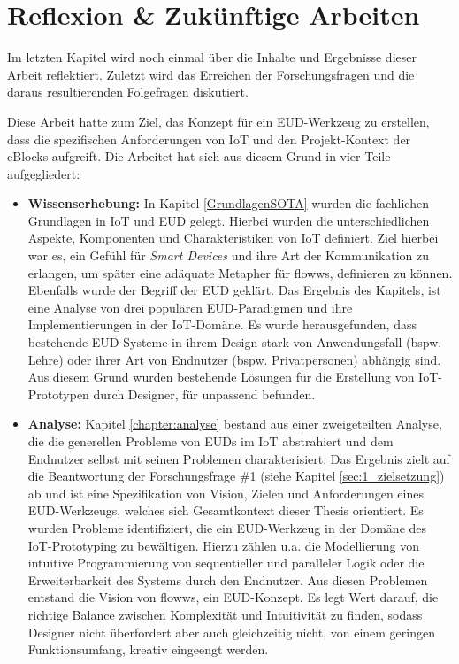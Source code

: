 \chapter{Reflexion \& Zukünftige Arbeiten}
Im letzten Kapitel wird noch einmal über die Inhalte und Ergebnisse dieser Arbeit reflektiert. Zuletzt wird das Erreichen der Forschungsfragen und die daraus resultierenden Folgefragen diskutiert.

Diese Arbeit hatte zum Ziel, das Konzept für ein \ac{EUD}-Werkzeug zu erstellen, dass die spezifischen Anforderungen von \ac{IoT} und den Projekt-Kontext der \acp{cBlock} aufgreift. Die Arbeitet hat sich aus diesem Grund in vier Teile aufgegliedert:

\begin{itemize}
    \item \textbf{Wissenserhebung:} In Kapitel \ref{GrundlagenSOTA} wurden die fachlichen Grundlagen in \ac{IoT} und \ac{EUD} gelegt. Hierbei wurden die unterschiedlichen Aspekte, Komponenten und Charakteristiken von \ac{IoT} definiert. Ziel hierbei war es, ein Gefühl für \textit{Smart Devices} und ihre Art der Kommunikation zu erlangen, um später eine adäquate Metapher für flowws, definieren zu können. Ebenfalls wurde der Begriff der \ac{EUD} geklärt. Das Ergebnis des Kapitels, ist eine Analyse von drei populären \ac{EUD}-Paradigmen und ihre Implementierungen in der \ac{IoT}-Domäne. Es wurde herausgefunden, dass bestehende \ac{EUD}-Systeme in ihrem Design stark von Anwendungsfall (bspw. Lehre) oder ihrer Art von Endnutzer (bspw. Privatpersonen) abhängig sind. Aus diesem Grund wurden bestehende Lösungen für die Erstellung von \ac{IoT}-Prototypen durch Designer, für unpassend befunden. 
    \item \textbf{Analyse:} Kapitel \ref{chapter:analyse} bestand aus einer zweigeteilten Analyse, die die generellen Probleme von \acp{EUD} im \ac{IoT} abstrahiert und dem Endnutzer selbst mit seinen Problemen charakterisiert. Das Ergebnis zielt auf die Beantwortung der Forschungsfrage \#1 (siehe Kapitel \ref{sec:1_zielsetzung}) ab und ist eine Spezifikation von Vision, Zielen und Anforderungen eines \ac{EUD}-Werkzeugs, welches sich Gesamtkontext dieser Thesis orientiert. Es wurden Probleme identifiziert, die ein \ac{EUD}-Werkzeug in der Domäne des \ac{IoT}-Prototyping zu bewältigen. Hierzu zählen u.a. die Modellierung von intuitive Programmierung von sequentieller und paralleler Logik oder die Erweiterbarkeit des Systems durch den Endnutzer. Aus diesen Problemen entstand die Vision von flowws, ein \ac{EUD}-Konzept. Es legt Wert darauf, die richtige Balance zwischen Komplexität und Intuitivität zu finden, sodass Designer nicht überfordert aber auch gleichzeitig nicht, von einem geringen Funktionsumfang, kreativ eingeengt werden.

\end{itemize}

